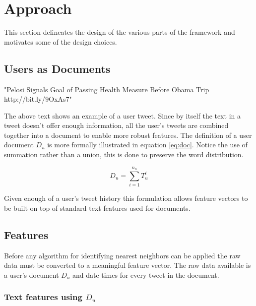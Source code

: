 \documentclass{article}
\begin{document}
\section{Approach}

This section delineates the design of the various parts of the framework
and motivates some of the design choices.

\subsection{Users as Documents}

\begin{center}
    "Pelosi Signals Goal of Passing Health Measure Before Obama Trip http://bit.ly/9OxAs7"
\end{center}

The above text shows an example of a user tweet. Since by itself the text in
a tweet doesn't offer enough information, all the user's tweets are combined together into a 
document to enable more robust features. The definition of a user document $D_u$ is more formally illustrated in
equation \ref{eq:doc}. Notice the use of summation rather than a union, this is done to preserve the
word distribution.

\begin{center}
\begin{equation}
D_u = \sum_{i=1}^{n_u}T_{u}^{i}
\label{eq:doc}
\end{equation}
\end{center}

Given enough of a user's tweet history this formulation allows feature vectors to be built
on top of standard text features used for documents.


\subsection{Features}

\label{TODO:add not as to why at and hash are not useful support with data}

Before any algorithm for identifying nearest neighbors can be applied the raw data
must be converted to a meaningful feature vector. The raw data available is
a user's document $D_u$ and date times for every tweet in the document.

\subsubsection{Text features using $D_u$}
\end{document}

